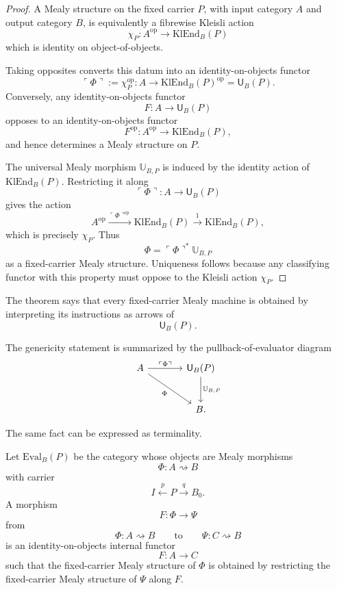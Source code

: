 \begin{proof}
A Mealy structure on the fixed carrier \(P\), with input category \(A\) and output category \(B\),
is equivalently a fibrewise Kleisli action
\[
        \chi_P:A^{\operatorname{op}}\longrightarrow \mathrm{KlEnd}_B(P)
\]
which is identity on object-of-objects.

Taking opposites converts this datum into an identity-on-objects functor
\[
        \ulcorner\Phi\urcorner
        :=
        \chi_P^{\operatorname{op}}:
        A\longrightarrow
        \mathrm{KlEnd}_B(P)^{\operatorname{op}}
        =
        \mathsf U_B(P).
\]
Conversely, any identity-on-objects functor
\[
        F:A\longrightarrow \mathsf U_B(P)
\]
opposes to an identity-on-objects functor
\[
        F^{\operatorname{op}}:
        A^{\operatorname{op}}\longrightarrow \mathrm{KlEnd}_B(P),
\]
and hence determines a Mealy structure on \(P\).

The universal Mealy morphism \(\mathbb U_{B,P}\) is induced by the identity action of
\(\mathrm{KlEnd}_B(P)\).  Restricting it along
\[
        \ulcorner\Phi\urcorner:A\to\mathsf U_B(P)
\]
gives the action
\[
        A^{\operatorname{op}}
        \xrightarrow{\ulcorner\Phi\urcorner^{\operatorname{op}}}
        \mathrm{KlEnd}_B(P)
        \xrightarrow{1}
        \mathrm{KlEnd}_B(P),
\]
which is precisely \(\chi_P\).  Thus
\[
        \Phi
        =
        \ulcorner\Phi\urcorner^{\ast}\mathbb U_{B,P}
\]
as a fixed-carrier Mealy structure.  Uniqueness follows because any classifying functor with this
property must oppose to the Kleisli action \(\chi_P\).
\end{proof}

The theorem says that every fixed-carrier Mealy machine is obtained by interpreting its
instructions as arrows of
\[
        \mathsf U_B(P).
\]

The genericity statement is summarized by the pullback-of-evaluator diagram
\[
\begin{tikzcd}[column sep=large,row sep=large]
A
\ar[r,"\ulcorner\Phi\urcorner"]
\ar[dr,swap,"\Phi"]
&
\mathsf U_B(P)
\ar[d,"\mathbb U_{B,P}"]
\\
&
B .
\end{tikzcd}
\]

The same fact can be expressed as terminality.

\begin{definition}
Let \(\mathrm{Eval}_B(P)\) be the category whose objects are Mealy morphisms
\[
        \Phi:A\rightsquigarrow B
\]
with carrier
\[
        I\xleftarrow{p}P\xrightarrow{q}B_0.
\]
A morphism
\[
        F:\Phi\longrightarrow\Psi
\]
from
\[
        \Phi:A\rightsquigarrow B
        \qquad\text{to}\qquad
        \Psi:C\rightsquigarrow B
\]
is an identity-on-objects internal functor
\[
        F:A\longrightarrow C
\]
such that the fixed-carrier Mealy structure of \(\Phi\) is obtained by restricting the
fixed-carrier Mealy structure of \(\Psi\) along \(F\).
\end{definition}

